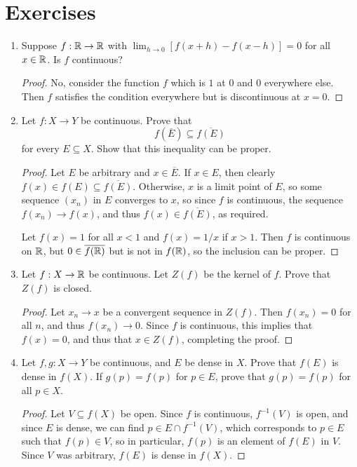 \section{Exercises}
\begin{enumerate}
\item %
Suppose $f: \mathbb{R} \rightarrow \mathbb{R}$ with $\lim_{h \to 0}[f(x+h) - f(x-h)] = 0$ for all $x \in \mathbb{R}$. Is $f$ continuous?
\begin{proof}
No, consider the function $f$ which is $1$ at $0$ and $0$ everywhere else. Then $f$ satisfies the condition everywhere but is discontinuous at $x = 0$.
\end{proof}

\item %
Let $f: X \to Y$ be continuous. Prove that
\[
    f(\overline{E}) \subseteq \overline{f(E)}
\]
for every $E \subseteq X$. Show that this inequality can be proper.

\begin{proof}
    Let $E$ be arbitrary and $x \in \overline{E}$. If $x \in E$, then clearly $f(x) \in f(E) \subseteq \overline{f(E)}$. Otherwise, $x$ is a limit point of $E$, so some sequence $(x_n)$ in $E$ converges to $x$, so since $f$ is continuous, the sequence $f(x_n) \to f(x)$, and thus $f(x) \in \overline{f(E)}$, as required.

    Let $f(x) = 1$ for all $x < 1$ and $f(x) = 1/x$ if $x > 1$. Then $f$ is continuous on $\mathbb{R}$, but $0 \in \overline{f(\mathbb{R})}$ but is not in $f(\mathbb{R})$, so the inclusion can be proper.
\end{proof}

\item %
Let $f: X \rightarrow \mathbb{R}$ be continuous. Let $Z(f)$ be the kernel of $f$. Prove that $Z(f)$ is closed.
\begin{proof}
    Let $x_n \to x$ be a convergent sequence in $Z(f)$. Then $f(x_n) = 0$ for all $n$, and thus $f(x_n) \to 0$. Since $f$ is continuous, this implies that $f(x) = 0$, and thus that $x \in Z(f)$, completing the proof.
\end{proof}

\item %
Let $f, g: X \to Y$ be continuous, and $E$ be dense in $X$. Prove that $f(E)$ is dense in $f(X)$. If $g(p) = f(p)$ for $p \in E$, prove that $g(p) = f(p)$ for all $p \in X$.

\begin{proof}
    Let $V \subseteq f(X)$ be open. Since $f$ is continuous, $f^{-1}(V)$ is open, and since $E$ is dense, we can find $p \in E \cap f^{-1}(V)$, which corresponds to $p \in E$ such that $f(p) \in V$, so in particular, $f(p)$ is an element of $f(E)$ in $V$. Since $V$ was arbitrary, $f(E)$ is dense in $f(X)$. 


\end{proof}
\end{enumerate}
